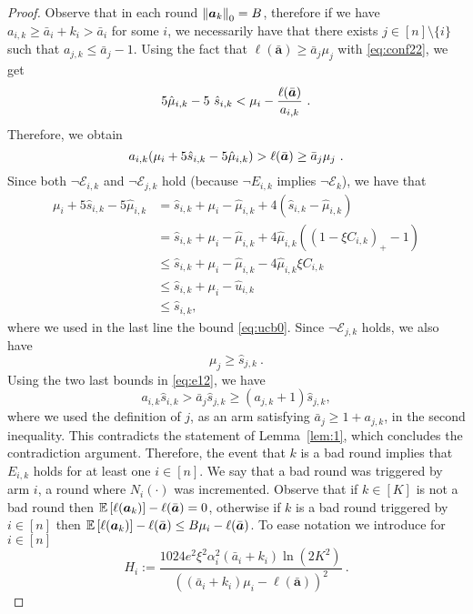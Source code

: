 \begin{proof}
	Observe that in each round $\left\| \bm{a}_k \right\|_0 = B$, therefore if we have $a_{i,k} \ge \bar{a}_i+k_i > \bar{a}_i$ for some $i$, we necessarily have that there exists $j \in [n]\setminus \{i\}$ such that $a_{j,k} \le \bar{a}_j-1$. Using the fact that $\ell(\bar{\bm{a}}) \ge \bar{a}_j \mu_j$ with \eqref{eq:conf22}, we get
	$$
	5\hat{\mu}_{i,k} -5~\hat{s}_{i,k} < \mu_i - \frac{\ell(\bar{\bm{a}})}{a_{i,k}}~.
	$$
	Therefore, we obtain
	\begin{equation}\label{eq:e12}
		a_{i,k}(\mu_i+ 5\hat{s}_{i,k}-5\hat{\mu}_{i,k}) > \ell(\bar{\bm{a}}) \ge \bar{a}_j \mu_j~.
	\end{equation}
	Since both $\neg \mathcal{E}_{i,k}$ and $\neg \mathcal{E}_{j,k}$ hold (because $\neg E_{i,k}$ implies $\neg \mathcal{E}_k$), we have that
	\begin{align*}
		\mu_i +5\hat{s}_{i,k}-5\hat{\mu}_{i,k} &=  \hat{s}_{i,k} + \mu_i - \hat{\mu}_{i,k} + 4 \left(\hat{s}_{i,k} - \hat{\mu}_{i,k} \right)\\
		&= \hat{s}_{i,k} + \mu_i - \hat{\mu}_{i,k} + 4\hat{\mu}_{i,k} \left((1-\xi C_{i,k})_{+}-1 \right)\\
		&\le \hat{s}_{i,k} + \mu_i - \hat{\mu}_{i,k} - 4\hat{\mu}_{i,k} \xi C_{i,k}\\
		&\le \hat{s}_{i,k} + \mu_i - \hat{u}_{i,k}\\
		&\le \hat{s}_{i,k},
	\end{align*} 
	where we used in the last line the bound \eqref{eq:ucb0}. Since $\neg \mathcal{E}_{j,k}$ holds, we also have
	\begin{equation*}
		\mu_j \ge \hat{s}_{j,k}~.
	\end{equation*}
	Using the two last bounds in \eqref{eq:e12}, we have
	$$
	a_{i,k} \hat{s}_{i,k} > \bar{a}_j \hat{s}_{j,k} \ge (a_{j,k}+1) \hat{s}_{j,k},
	$$
	where we used the definition of $j$, as an arm satisfying $\bar{a}_j \ge 1+a_{j,k}$, in the second inequality.
	This contradicts the statement of Lemma~\ref{lem:1}, which concludes the contradiction argument. Therefore, the event that $k$ is a bad round implies that $E_{i,k}$ holds for at least one $i\in [n]$.
	We say that a bad round was triggered by arm $i$, a round where $N_i(\cdot)$ was incremented. 
	Observe that if $k \in [K]$ is not a bad round then $\mathbb{E}\left[\ell(\bm{a}_k)\right]-\ell(\bar{\bm{a}})=0$, otherwise if $k$ is a bad round triggered by $i \in [n]$ then $\mathbb{E}\left[\ell(\bm{a}_{k})\right]-\ell(\bar{\bm{a}}) \le B\mu_i-\ell(\bar{\bm{a}})$.
	To ease notation we introduce for $i\in [n]$
	$$
	H_i := \frac{1024e^2 \xi^2\alpha_i^2 (\bar{a}_i+k_i) \ln(2K^2)}{\left((\bar{a}_i+k_i)\mu_i - \ell(\bar{\bm{a}})\right)^2}~.
$$
\end{proof}
